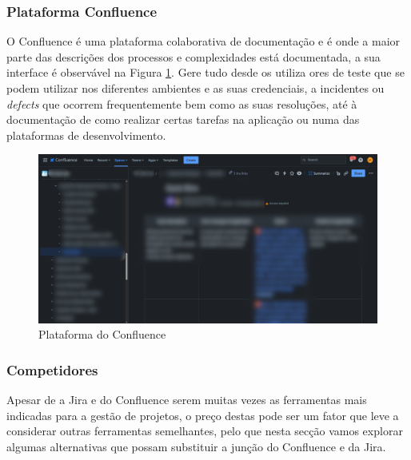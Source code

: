        \subsubsection{Plataforma Confluence}\label{secsec:confluence}

            O Confluence é uma plataforma colaborativa de documentação e é onde a maior parte das descrições dos processos e complexidades está documentada, a sua interface é observável na Figura \ref{fig:confluence-ui}. Gere tudo desde os utiliza
            ores de teste que se podem utilizar nos diferentes ambientes e as suas credenciais, a incidentes ou \textit{defects} que ocorrem frequentemente bem como as suas resoluções, até à documentação de como realizar certas tarefas na aplicação ou numa das plataformas de desenvolvimento.
            
            \begin{figure}[htbp]
                \centering
                \includegraphics[width=\textwidth]{imgs/Confluence.png}
                \caption{Plataforma do Confluence}\label{fig:confluence-ui}
            \end{figure}

        
        \subsubsection{Competidores}\label{competidores-jira-confluence}

            Apesar de a Jira e do Confluence serem muitas vezes as ferramentas mais indicadas para a gestão de projetos, o preço destas pode ser um fator que leve a considerar outras ferramentas semelhantes, pelo que nesta secção vamos explorar algumas alternativas que possam substituir a junção do Confluence e da Jira.

